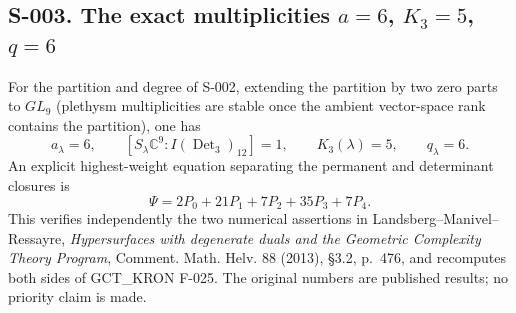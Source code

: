 \subsection{S-003. The exact multiplicities $a=6$, $K_3=5$, $q=6$}
For the partition and degree of S-002, extending the partition by two
zero parts to $GL_9$ (plethysm multiplicities are stable once the ambient
vector-space rank contains the partition), one has
\[
 a_\lambda=6,\qquad
 [S_\lambda\mathbb C^9:I(\operatorname{Det}_3)_{12}]=1,
 \qquad K_3(\lambda)=5,\qquad q_\lambda=6.
\]
An explicit highest-weight equation separating the permanent and
 determinant closures is
\[
                  \Psi=2P_0+21P_1+7P_2+35P_3+7P_4.
\]
This verifies independently the two numerical assertions in
Landsberg--Manivel--Ressayre, \emph{Hypersurfaces with degenerate duals
and the Geometric Complexity Theory Program}, Comment.
Math.
Helv.
88 (2013), \S3.2, p.~476, and recomputes both sides of GCT\_KRON F-025.
The original numbers are published results; no priority claim is made.

